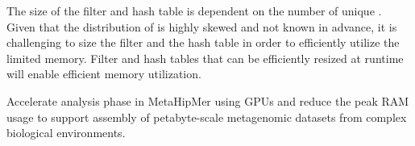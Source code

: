 The size of the filter and hash table is dependent on the number of unique \kmers. Given that the distribution of \kmers is highly skewed and not known in advance, it is challenging to size the filter and the hash table in order to efficiently utilize the limited memory. Filter and hash tables that can be efficiently resized at runtime will enable efficient memory utilization.


\begin{rproblem}
Accelerate \kmer analysis phase in MetaHipMer using GPUs and reduce the peak RAM usage to support assembly of petabyte-scale metagenomic datasets from complex biological environments.
\label{rprob:metahipmer}
\end{rproblem}

\fi